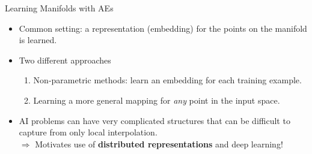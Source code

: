 \begin{vbframe}{Learning Manifolds with AEs}
\begin{itemize}
   \end{itemize}

\framebreak

    \begin{itemize}
        \item Common setting: a representation (embedding) for the points on the manifold is learned.
        \item Two different approaches
            \begin{enumerate}
                \item Non-parametric methods: learn an embedding for each training example.
                \item Learning a more general mapping for \textit{any} point in the input space.
            \end{enumerate}
        \item %
        AI problems can have very complicated structures that can be difficult to capture from only local interpolation.\\
            $\Rightarrow$ Motivates use of \textbf{distributed representations} and deep learning!
    \end{itemize}
\end{vbframe}




\endlecture

